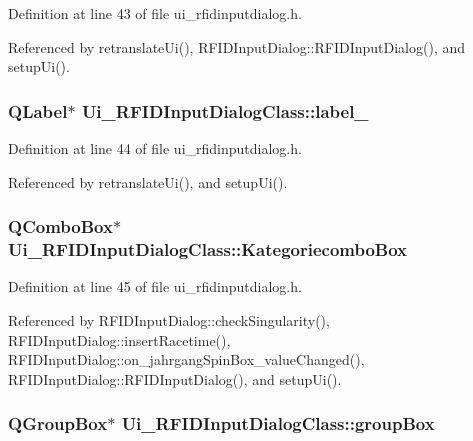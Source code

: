 Definition at line 43 of file ui\_\-rfidinputdialog.h.

Referenced by retranslateUi(), RFIDInputDialog::RFIDInputDialog(), and setupUi().\hypertarget{class_ui___r_f_i_d_input_dialog_class_d894fc842438a63d08cda7a320266b2a}{
\subsubsection[label\_\-14]{\setlength{\rightskip}{0pt plus 5cm}QLabel$\ast$ {\bf Ui\_\-RFIDInputDialogClass::label\_}}}
\label{class_ui___r_f_i_d_input_dialog_class_d894fc842438a63d08cda7a320266b2a}




Definition at line 44 of file ui\_\-rfidinputdialog.h.

Referenced by retranslateUi(), and setupUi().\hypertarget{class_ui___r_f_i_d_input_dialog_class_5e8b3cf5f29c85c7592ca34fd56ec686}{
\subsubsection[KategoriecomboBox]{\setlength{\rightskip}{0pt plus 5cm}QComboBox$\ast$ {\bf Ui\_\-RFIDInputDialogClass::KategoriecomboBox}}}
\label{class_ui___r_f_i_d_input_dialog_class_5e8b3cf5f29c85c7592ca34fd56ec686}




Definition at line 45 of file ui\_\-rfidinputdialog.h.

Referenced by RFIDInputDialog::checkSingularity(), RFIDInputDialog::insertRacetime(), RFIDInputDialog::on\_\-jahrgangSpinBox\_\-valueChanged(), RFIDInputDialog::RFIDInputDialog(), and setupUi().\hypertarget{class_ui___r_f_i_d_input_dialog_class_852715288c091652b9bae61a4890017f}{
\subsubsection[groupBox]{\setlength{\rightskip}{0pt plus 5cm}QGroupBox$\ast$ {\bf Ui\_\-RFIDInputDialogClass::groupBox}}}
\label{class_ui___r_f_i_d_input_dialog_class_852715288c091652b9bae61a4890017f}




